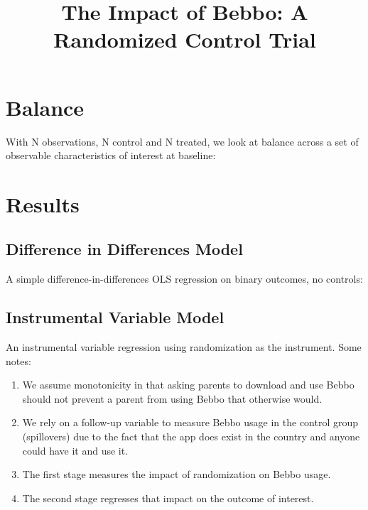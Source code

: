 \documentclass[a4paper,12pt]{article}
\title{The Impact of Bebbo: A Randomized Control Trial}
\theoremstyle{proposition}
\begin{document}
\maketitle

\section{Balance}

With N observations, N control and N treated, we look at balance across a set of observable characteristics of interest at baseline:



\clearpage
\section{Results}


\subsection{Difference in Differences Model}


A simple difference-in-differences OLS regression on binary outcomes, no controls:



\subsection{Instrumental Variable Model}

An instrumental variable regression using randomization as the instrument. Some notes:

\begin{enumerate}
\item We assume monotonicity in that asking parents to download and use Bebbo should not prevent a parent from using Bebbo that otherwise would.
\item We rely on a follow-up variable to measure Bebbo usage in the control group (spillovers) due to the fact that the app does exist in the country and anyone could have it and use it.
\item The first stage measures the impact of randomization on Bebbo usage.
\item The second stage regresses that impact on the outcome of interest.
\end{enumerate}
\end{document}
